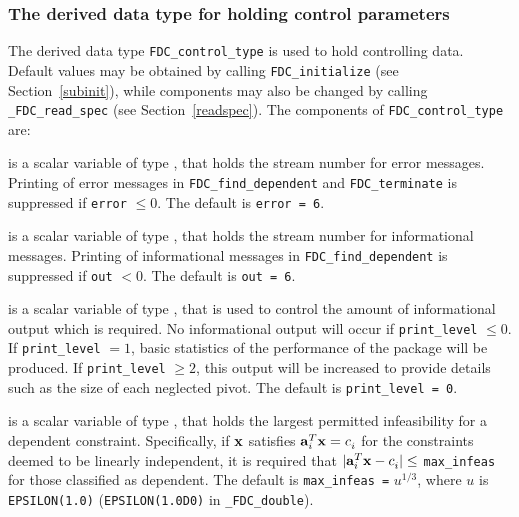 \documentclass{galahad}
\newcommand{\packagename}{FDC}
\newcommand{\fullpackagename}{\libraryname\_\-\packagename}
\begin{document}

\subsubsection{The derived data type for holding control
 parameters}\label{typecontrol}
The derived data type
{\tt \packagename\_control\_type}
is used to hold controlling data. Default values may be obtained by calling
{\tt \packagename\_initialize}
(see Section~\ref{subinit}),
while components may also be changed by calling
{\tt \fullpackagename\_read\-\_spec}
(see Section~\ref{readspec}).
The components of
{\tt \packagename\_control\_type}
are:

\begin{description}

 is a scalar variable of type \integer, that holds the
stream number for error messages. Printing of error messages in
{\tt \packagename\_find\_dependent} and {\tt \packagename\_terminate}
is suppressed if {\tt error} $\leq 0$.
The default is {\tt error = 6}.

 is a scalar variable of type \integer, that holds the
stream number for informational messages. Printing of informational messages in
{\tt \packagename\_find\_dependent} is suppressed if {\tt out} $< 0$.
The default is {\tt out = 6}.

 is a scalar variable of type \integer, that is used
to control the amount of informational output which is required. No
informational output will occur if {\tt print\_level} $\leq 0$. If
{\tt print\_level} $= 1$, basic statistics of the performance of the
package will be produced. If {\tt print\_level} $\geq 2$, this output will be
increased to provide details such as the size of each neglected pivot.
The default is {\tt print\_level = 0}.



 is a scalar variable of type \realdp, that holds the
largest permitted infeasibility for a dependent constraint. Specifically, if
${\mathbf{x}}$ satisfies ${\mathbf{a}}_i^T {\mathbf{x}} = c_i^{}$ for the constraints deemed to be
linearly independent, it is required that $|{\mathbf{a}}_i^T {\mathbf{x}} - c_i^{}| \leq$
{\tt max\_infeas} for those classified as dependent.
The default is {\tt max\_infeas =} $u^{1/3}$,
where $u$ is {\tt EPSILON(1.0)} ({\tt EPSILON(1.0D0)} in
{\tt \fullpackagename\_double}).


\end{description}
\end{document}
